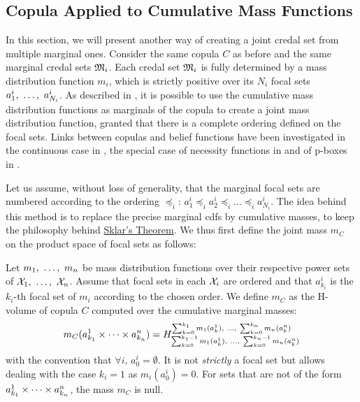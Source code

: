 \subsection{Copula Applied to Cumulative Mass Functions}\label{sec:joint_mass}
In this section, we will present another way of creating a joint credal set from multiple marginal ones. Consider the same copula $C$ as before and the same marginal credal sets $\mathfrak{M}_i$. Each credal set $\mathfrak{M}_i$ is fully determined by a mass distribution function $m_i$, which is strictly positive over its $N_i$ focal sets $a^i_1 , ~\ldots, ~ a^i_{N_i}$. As described in \cite{ferson_dependence_2004}, it is possible to use the cumulative mass distribution functions as marginals of the copula to create a joint mass distribution function, granted that there is a complete ordering defined on the focal sets. Links between copulas and belief functions have been investigated in the continuous case in \cite{schmelzer_joint_2015, schmelzer_multivariate_2019}, the special case of necessity functions in \cite{schmelzer_sklars_2015} and of p-boxes in \cite{schmelzer_random_2023}.

Let us assume, without loss of generality, that the marginal focal sets are numbered according to the ordering $\preceq_i$: $a^i_1\preceq_ia^i_2\preceq_i\ldots\preceq_i a^i_{N_i}$. The idea behind this method is to replace the precise marginal \acrshort{cdf}s by cumulative masses, to keep the philosophy behind \hyperref[theorem:sklar]{Sklar's Theorem}. We thus first define the joint mass $m_C$ on the product space of focal sets as follows:

\begin{definition}\label{def:joint_mass}
    Let $m_1 , ~\ldots, ~ m_n$ be mass distribution functions over their respective power sets of $\mathcal{X}_1 , ~\ldots, ~ \mathcal{X}_n$. Assume that focal sets in each $\mathcal{X}_i$ are ordered and that $a_{k_i}^i$ is the $k_i$-th focal set of $m_i$ according to the chosen order. We define $m_C$ as the H-volume of copula $C$ computed over the cumulative marginal masses:
    \begin{eqnarray}\label{eq:joint_mass}
        m_C(a^1_{k_1}\times\dots\times a^n_{k_n}) = H_{\sum_{k=0}^{k_1-1}m_1(a^1_k) , ~\ldots, ~ \sum_{k=0}^{k_n-1}m_n(a^n_k)}^{\sum_{k=0}^{k_1}m_1(a^1_k) , ~\ldots, ~ \sum_{k=0}^{k_n}m_n(a^n_k)}
    \end{eqnarray}
    with the convention that $\forall i,\, a^i_0=\emptyset$. It is not \textit{strictly} a focal set but allows dealing with the case $k_i=1$ as $m_i(a^i_0)=0$. For sets that are not of the form $a^1_{k_1}\times\dots\times a^n_{k_n}$, the mass $m_C$ is null.
\end{definition}

